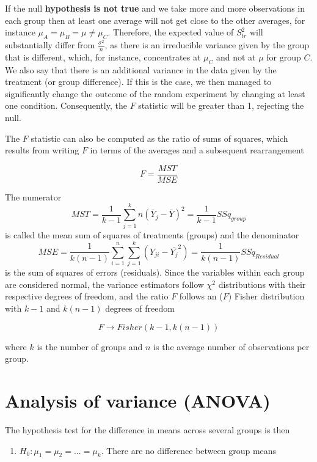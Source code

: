 \documentclass[
]{book}
\providecommand{\tightlist}{%
  \setlength{\itemsep}{0pt}\setlength{\parskip}{0pt}}
\begin{document}
If the null \textbf{hypothesis is not true} and we take more and more observations in each group then at least one average will not get close to the other averages, for instance \(\mu_A=\mu_B=\mu \neq \mu_C\). Therefore, the expected value of \(S^2_{tr}\) will substantially differ from \(\frac{\sigma^2}{n}\), as there is an irreducible variance given by the group that is different, which, for instance, concentrates at \(\mu_C\) and not at \(\mu\) for group \(C\). We also say that there is an additional variance in the data given by the treatment (or group difference). If this is the case, we then managed to significantly change the outcome of the random experiment by changing at least one condition. Consequently, the \(F\) statistic will be greater than 1, rejecting the null.

The \(F\) statistic can also be computed as the ratio of sums of squares, which results from writing \(F\) in terms of the averages and a subsequent rearrangement

\[F=\frac{MST}{MSE}\]

The numerator \[MST=\frac{1}{k-1}\sum_{j=1}^k n(\bar{Y}_j-\bar{Y})^2=\frac{1}{k-1}SSq_{group}\] is called the mean sum of squares of treatments (groups) and the denominator \[MSE= \frac{1}{k(n-1)}\sum_{i=1}^n \sum_{j=1}^k (Y_{ji}-\bar{Y_j}^2)=\frac{1}{k(n-1)}SSq_{Residual}\] is the sum of squares of errors (residuals). Since the variables within each group are considered normal, the variance estimators follow \(\chi^2\) distributions with their respective degrees of freedom, and the ratio \(F\) follows an (\(F\)) Fisher distribution with \(k-1\) and \(k(n-1)\) degrees of freedom

\[F \rightarrow Fisher(k-1, k(n-1))\]

where \(k\) is the number of groups and \(n\) is the average number of observations per group.

\hypertarget{analysis-of-variance-anova}{%
\section{Analysis of variance (ANOVA)}\label{analysis-of-variance-anova}}

The hypothesis test for the difference in means across several groups is then

\begin{enumerate}
\def\labelenumi{\alph{enumi}.}
\tightlist
\item
  \(H_0: \mu_1=\mu_2= ...=\mu_k\). There are no difference between group means
\end{enumerate}
\end{document}
